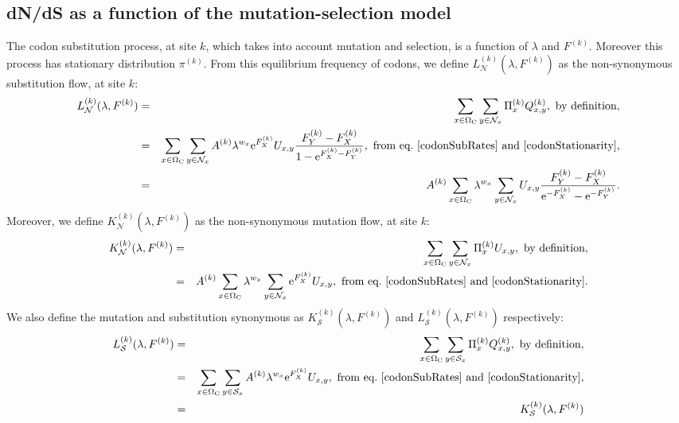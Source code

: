 \documentclass{article}
\newcommand{\e}{\mathrm{e}}
\newcommand{\SetCodon}{\Omega_{\mathrm{C}}}
\newcommand{\NonSyn}{\mathcal{N}}
\newcommand{\Syn}{\mathcal{S}}
\newcommand{\NxNonSyn}{\NonSyn_x}
\newcommand{\NxSyn}{\Syn_x}
\begin{document}
    \subsection{dN/dS as a function of the mutation-selection model}
    The codon substitution process, at site $k$, which takes into account mutation and selection, is a function of $\lambda$ and $F^{(k)}$. Moreover this process has stationary distribution $\pi^{(k)}$. From this equilibrium frequency of codons, we define $L_{\NonSyn}^{(k)}(\lambda, F^{(k)})$ as the non-synonymous substitution flow, at site $k$:
    \begin{eqnarray}
	    L_{\NonSyn}^{(k)}(\lambda, F^{(k)})
	    & = &   \sum_{x \in \SetCodon} \sum_{y \in \NxNonSyn} \Pi_x^{(k)} Q_{x, y}^{(k)}, \ \textrm{by definition},\\
	    & = & \sum_{x \in \SetCodon} \sum_{y \in \NxNonSyn} A^{(k)} \lambda^{w_x} \e^{F_X^{(k)}} U_{x, y} \dfrac{F_Y^{(k)} - F_X^{(k)}}{1 - \e^{F_X^{(k)} - F_Y^{(k)}}}, \ \textrm{from eq.}\ \ref{codonSubRates} \ \text{and} \ \ref{codonStationarity},\\
	    & = & A^{(k)} \sum_{x \in \SetCodon} \lambda^{w_x} \sum_{y \in \NxNonSyn}  U_{x, y} \dfrac{F_Y^{(k)} - F_X^{(k)}}{\e^{-F_X^{(k)}} - \e^{ - F_Y^{(k)}}}.
	    \label{subFlowNonSyn}
    \end{eqnarray}
    Moreover, we define $K_{\NonSyn}^{(k)}(\lambda, F^{(k)})$ as the non-synonymous mutation flow, at site $k$:
    \begin{eqnarray}
	    K_{\NonSyn}^{(k)}(\lambda, F^{(k)})
	    & = &   \sum_{x \in \SetCodon} \sum_{y \in \NxNonSyn} \Pi_x^{(k)} U_{x, y}, \ \textrm{by definition},\\
	    & = &  A^{(k)}  \sum_{x \in \SetCodon} \lambda^{w_x} \sum_{y \in \NxNonSyn} \e^{F_X^{(k)}} U_{x, y}, \ \textrm{from eq.}\ \ref{codonSubRates} \ \text{and} \ \ref{codonStationarity}.
	    \label{mutFlowNonSyn}
    \end{eqnarray}
    We also define the mutation and substitution synonymous as $K_{\Syn}^{(k)}(\lambda, F^{(k)})$ and $L_{\Syn}^{(k)}(\lambda, F^{(k)})$ respectively:
	\begin{eqnarray}
		L_{\Syn}^{(k)}(\lambda, F^{(k)})
		& = &   \sum_{x \in \SetCodon} \sum_{y \in \NxSyn} \Pi_x^{(k)} Q_{x, y}^{(k)}, \ \textrm{by definition},\\
		& = & \sum_{x \in \SetCodon} \sum_{y \in \NxSyn} A^{(k)} \lambda^{w_x} \e^{F_X^{(k)}} U_{x, y}, \ \textrm{from eq.}\ \ref{codonSubRates} \ \text{and} \ \ref{codonStationarity}, \\
		& = & K_{\Syn}^{(k)}(\lambda, F^{(k)})
		\label{subFlowSyn}
	\end{eqnarray}
\end{document}
